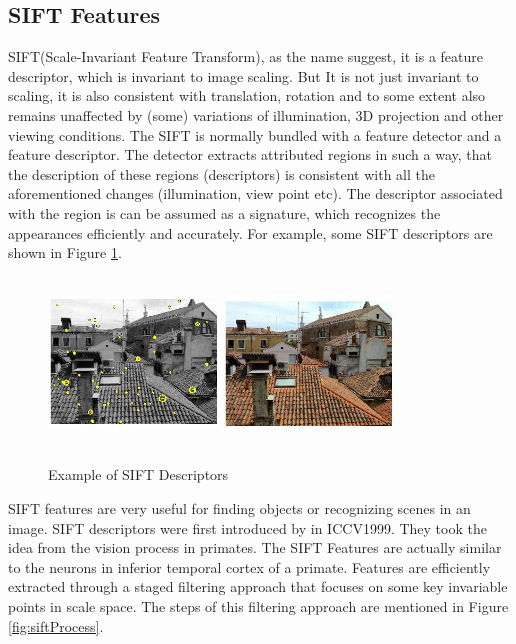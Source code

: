 \subsection{SIFT Features}
SIFT(Scale-Invariant Feature Transform), as the name suggest, it is a feature descriptor, which is invariant to image scaling. But It is 
not just invariant to scaling, it is also consistent with translation, rotation and to some extent also remains unaffected by (some) variations of illumination, 3D projection and other viewing conditions. The SIFT is normally bundled with a feature detector and a feature descriptor. The detector extracts attributed regions in such a way, that the description of these regions (descriptors) is consistent with all the aforementioned changes (illumination, view point etc). The descriptor associated with the region is can be assumed as a signature, which recognizes the appearances efficiently and accurately. For example, some SIFT descriptors are shown in Figure  \ref{fig:siftExample}.
 \begin{center}
\begin{figure}
\centering
\includegraphics[width=4.5cm, height=4.5cm]{./Pictures/SIFT/siftDescriptorExample.jpg}
\includegraphics[width=4.5cm, height=4.5cm]{./Pictures/SIFT/siftExample.jpg}
\caption{Example of SIFT Descriptors}
\label{fig:siftExample}
\end{figure}
\end{center}
SIFT features are very useful for finding objects or recognizing scenes in an image. SIFT descriptors were first introduced by \citet*{lowe} in ICCV1999. They took the idea from the vision process in primates. The SIFT Features are actually similar to the neurons in inferior temporal cortex of a primate. Features are efficiently extracted through a staged filtering approach that focuses on some key invariable points in scale space. The steps of this filtering approach are mentioned in Figure \ref{fig:siftProcess}.
